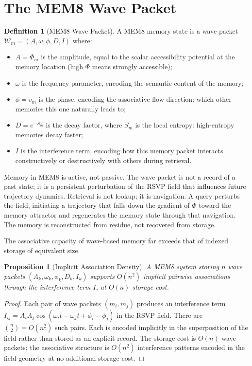 \documentclass[12pt, oneside]{book}
\theoremstyle{flyxion}
\newtheorem{proposition}[theorem]{Proposition}
\theoremstyle{definition}
\newtheorem{definition}[theorem]{Definition}
\begin{document}
\section{The MEM\textbar{}8 Wave Packet}

\begin{definition}[MEM\textbar{}8 Wave Packet]
A MEM\textbar{}8 memory state is a wave packet
$\mathcal{W}_m = (A, \omega, \phi, D, I)$ where:
\begin{itemize}
\item $A = \Phi_m$ is the amplitude, equal to the
      scalar accessibility potential at the memory
      location (high $\Phi$ means strongly accessible);
\item $\omega$ is the frequency parameter, encoding
      the semantic content of the memory;
\item $\phi = v_m$ is the phase, encoding the
      associative flow direction: which other memories
      this one naturally leads to;
\item $D = e^{-S_m}$ is the decay factor, where $S_m$
      is the local entropy: high-entropy memories decay
      faster;
\item $I$ is the interference term, encoding how this
      memory packet interacts constructively or
      destructively with others during retrieval.
\end{itemize}
\end{definition}

Memory in MEM\textbar{}8 is active, not passive.
The wave packet is not a record of a past state; it
is a persistent perturbation of the RSVP field that
influences future trajectory dynamics. Retrieval
is not lookup; it is navigation. A query perturbs
the field, initiating a trajectory that falls down
the gradient of $\Phi$ toward the memory attractor
and regenerates the memory state through that
navigation. The memory is reconstructed from residue,
not recovered from storage.

The associative capacity of wave-based memory far
exceeds that of indexed storage of equivalent size.

\begin{proposition}[Implicit Association Density]
\label{prop:assoc_density}
A MEM\textbar{}8 system storing $n$ wave packets
$(A_k, \omega_k, \phi_k, D_k, I_k)$ supports
$O(n^2)$ implicit pairwise associations through
the interference term $I$, at $O(n)$ storage cost.
\end{proposition}

\begin{proof}
Each pair of wave packets $(m_i, m_j)$ produces an
interference term $I_{ij} = A_i A_j \cos(\omega_i t
- \omega_j t + \phi_i - \phi_j)$ in the RSVP field.
There are $\binom{n}{2} = O(n^2)$ such pairs. Each
is encoded implicitly in the superposition of the
field rather than stored as an explicit record.
The storage cost is $O(n)$ wave packets; the
associative structure is $O(n^2)$ interference
patterns encoded in the field geometry at no
additional storage cost.
\end{proof}
\end{document}
